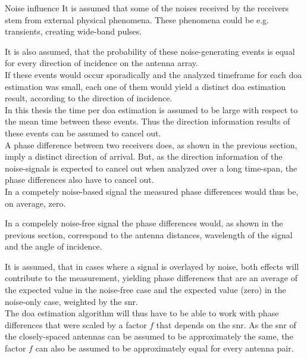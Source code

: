 \begin{subchapter}{Noise influence}
  It is assumed that some of the noises received
  by the receivers stem from external physical
  phenomena.
  These phenomena could be e.g. transients, creating
  wide-band pulses.

  It is also assumed, that the probability
  of these noise-generating events is equal for every direction
  of incidence on the antenna array. \\

  If these events would occur sporadically and the analyzed
  timeframe for each \gls{doa} estimation was small,
  each one of them would yield a distinct \gls{doa} estimation
  result, according to the direction of incidence. \\

  In this thesis the time per \gls{doa} estimation
  is assumed to be large with respect to the mean
  time between these events.
  Thus the direction information results of these
  events can be assumed to cancel out. \\

  A phase difference between two receivers does,
  as shown in the previous section, imply a distinct
  direction of arrival.
  But, as the direction information of the
  noise-signals is expected to cancel out when
  analyzed over a long time-span, the phase differences
  also have to cancel out. \\

  In a competely noise-based signal the measured phase
  differences would thus be, on average, zero.

  In a compelely noise-free signal the phase differences
  would, as shown in the previous section, correspond to the
  antenna distances, wavelength of the signal and the angle
  of incidence.

  It is assumed, that in cases where a signal is
  overlayed by noise, both effects will contribute to the measurement,
  yielding phase differences that are an average of
  the expected value in the noise-free case and the
  expected value (zero) in the noise-only case, weighted by
  the \gls{snr}. \\

  The \gls{doa} estimation algorithm will thus
  have to be able to work with phase differences
  that were scaled by a factor $f$ that depends
  on the \gls{snr}.
  As the \gls{snr} of the closely-spaced antennas
  can be assumed to be approximately the same,
  the factor $f$ can also be assumed to be approximately
  equal for every antenna pair.
\end{subchapter}

